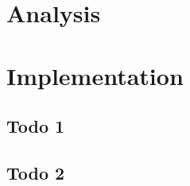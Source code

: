 \documentclass[twoside]{ctuthesis}
\begin{document}
\maketitle




\part{Analysis}




\part{Implementation}
\chapter{Todo 1}
\chapter{Todo 2}

\appendix
\printindex


\end{document}

